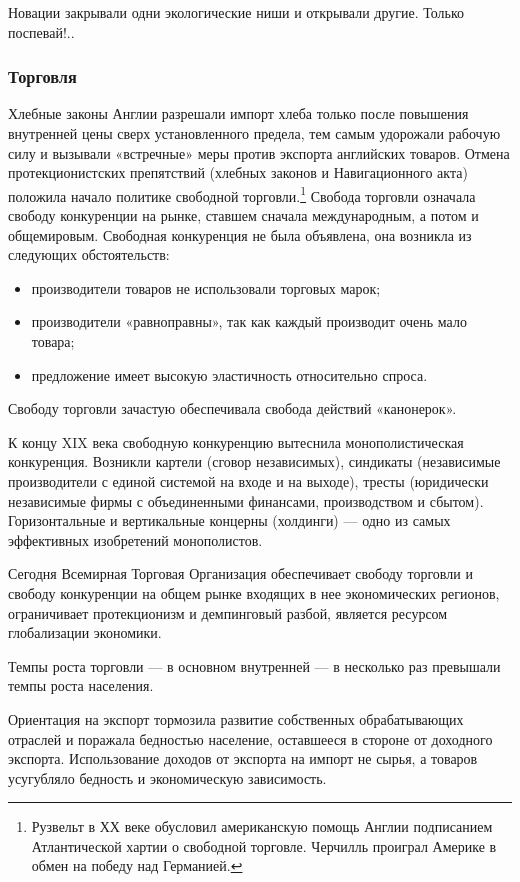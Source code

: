 Новации закрывали одни экологические ниши и открывали другие. Только поспевай!..

\subsubsection[Торговля]{Торговля}

Хлебные законы Англии разрешали импорт хлеба только после повышения внутренней цены сверх установленного предела, тем
самым удорожали рабочую силу и вызывали «встречные» меры против экспорта английских товаров. Отмена протекционистских
препятствий (хлебных законов и Навигационного акта) положила начало политике свободной
торговли.\footnote{Рузвельт в ХХ веке обусловил американскую помощь Англии подписанием Атлантической
хартии о свободной торговле. Черчилль проиграл Америке в обмен на победу над Германией.} Свобода торговли означала
свободу конкуренции на рынке, ставшем сначала международным, а потом и общемировым. Свободная конкуренция не была
объявлена, она возникла из следующих обстоятельств:

\begin{itemize}
\item производители товаров не использовали торговых марок;
\item производители «равноправны», так как каждый производит очень мало товара;
\item предложение имеет высокую эластичность относительно спроса.
\end{itemize}

Свободу торговли зачастую обеспечивала свобода действий «канонерок».

К концу XIX века свободную конкуренцию вытеснила монополистическая конкуренция. Возникли картели (сговор независимых),
синдикаты (независимые производители с единой системой на входе и на выходе), тресты (юридически независимые фирмы с
объединенными финансами, производством и сбытом). Горизонтальные и вертикальные концерны (холдинги) — одно из самых
эффективных изобретений монополистов.

Сегодня Всемирная Торговая Организация обеспечивает свободу торговли и свободу конкуренции на общем рынке входящих в нее
экономических регионов, ограничивает протекционизм и демпинговый разбой, является ресурсом глобализации экономики.


Темпы роста торговли — в основном внутренней — в несколько раз превышали темпы роста населения.


Ориентация на экспорт тормозила развитие собственных обрабатывающих отраслей и поражала бедностью население, оставшееся
в стороне от доходного экспорта. Использование доходов от экспорта на импорт не сырья, а товаров усугубляло бедность и
экономическую зависимость.



